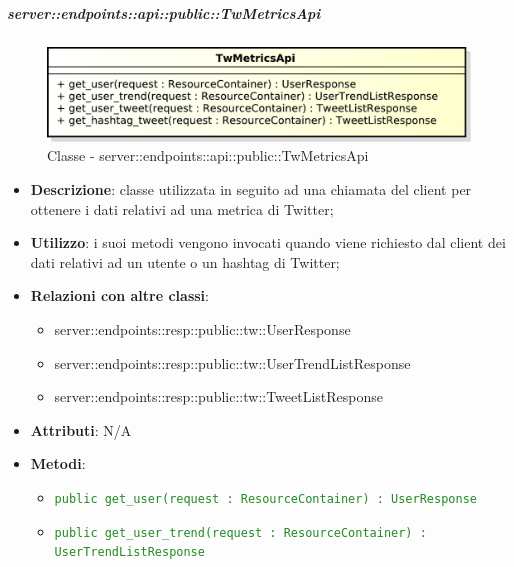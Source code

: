     \subparagraph{server::endpoints::api::public::TwMetricsApi} %
    \label{subp:bdsm_app_server_endpoints_api_public_twmetricsapi}
	\begin{figure}[!htbp]
		\centering
		\centerline{\includegraphics[scale=0.6]{./images/server/classes/endpoints/tw_metrics_api.pdf}}
		\caption{Classe - server::endpoints::api::public::TwMetricsApi}
	\end{figure}
    \begin{itemize}
      \item \textbf{Descrizione}: classe utilizzata in seguito ad una chiamata del client per ottenere i dati relativi ad una metrica di Twitter;
      \item \textbf{Utilizzo}: i suoi metodi vengono invocati quando viene richiesto dal client dei dati relativi ad un utente o un hashtag di Twitter;
      \item \textbf{Relazioni con altre classi}:
        \begin{itemize}
          \item server::endpoints::resp::public::tw::UserResponse
          \item server::endpoints::resp::public::tw::UserTrendListResponse
          \item server::endpoints::resp::public::tw::TweetListResponse
        \end{itemize}
		\item \textbf{Attributi}: N/A
		\item \textbf{Metodi}:
			\begin{itemize}
				\item \textcolor{forestgreen}{\texttt{public get\_user(request : ResourceContainer) : UserResponse}}
				\item \textcolor{forestgreen}{\texttt{public get\_user\_trend(request : ResourceContainer) : UserTrendListResponse}}
        \begin{description}

\end{description}
\end{itemize}
\end{itemize}
